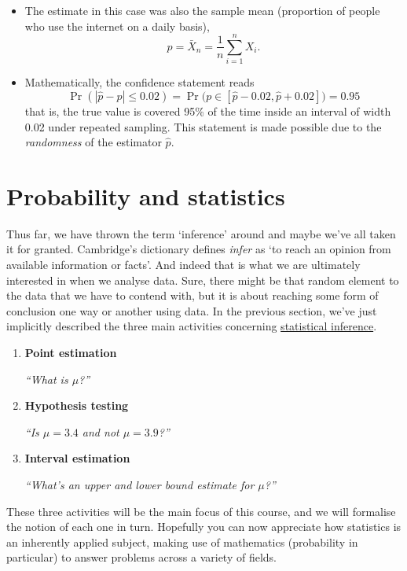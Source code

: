 \documentclass[
]{book}
\theoremstyle{definition}
\theoremstyle{definition}
\theoremstyle{definition}
\theoremstyle{definition}
\theoremstyle{remark}
\begin{document}
\begin{itemize}
\item
  The estimate in this case was also the sample mean (proportion of people who use the internet on a daily basis),
  \[
  \hat p = \bar X_n = \frac{1}{n}\sum_{i=1}^n X_i.
  \]
\item
  Mathematically, the confidence statement reads
  \[
  \Pr(|\hat p - p| \leq 0.02 ) = \Pr\big(p\in [\hat p-0.02, \hat p + 0.02]\big) = 0.95
  \]
  that is, the true value is covered 95\% of the time inside an interval of width 0.02 under repeated sampling. This statement is made possible due to the \emph{randomness} of the estimator \(\hat p\).
\end{itemize}

\hypertarget{probability-and-statistics}{%
\section*{Probability and statistics}\label{probability-and-statistics}}

Thus far, we have thrown the term `inference' around and maybe we've all taken it for granted.
Cambridge's dictionary defines \emph{infer} as `to reach an opinion from available information or facts'.
And indeed that is what we are ultimately interested in when we analyse data.
Sure, there might be that random element to the data that we have to contend with, but it is about reaching some form of conclusion one way or another using data.
In the previous section, we've just implicitly described the three main activities concerning \uline{statistical inference}.

\begin{enumerate}
\def\labelenumi{\arabic{enumi}.}
\item
  \textbf{Point estimation}

  \emph{``What is \(\mu\)?''}
\item
  \textbf{Hypothesis testing}

  \emph{``Is \(\mu=3.4\) and not \(\mu=3.9\)?''}
\item
  \textbf{Interval estimation}

  \emph{``What's an upper and lower bound estimate for \(\mu\)?''}
\end{enumerate}

These three activities will be the main focus of this course, and we will formalise the notion of each one in turn.
Hopefully you can now appreciate how statistics is an inherently applied subject, making use of mathematics (probability in particular) to answer problems across a variety of fields.
\end{document}
